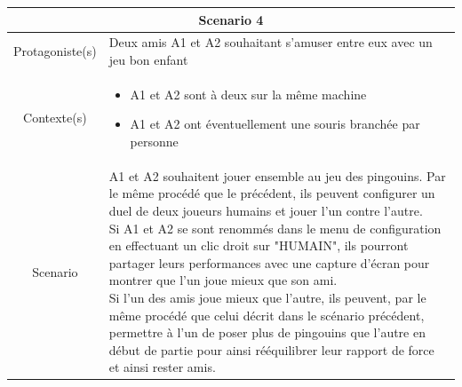 \documentclass{report}
\begin{document}
\begin{tabular}{|c|l|}
\hline
 \multicolumn{2}{|c|}{Scenario 4}\\
 \hline
 Protagoniste(s) & Deux amis A1 et A2 souhaitant s'amuser entre eux avec un jeu bon enfant \\
 \hline
 Contexte(s) & \parbox{13cm} {\begin{itemize}
 	\item A1 et A2 sont à deux sur la même machine
 	\item A1 et A2 ont éventuellement une souris branchée par personne
\end{itemize} }\\
 \hline
 Scenario & \parbox{13cm}{  A1 et A2 souhaitent jouer ensemble au jeu des pingouins. Par le même procédé que le précédent, ils peuvent configurer un duel de deux joueurs humains et jouer l'un contre l'autre. \\
 Si A1 et A2 se sont renommés dans le menu de configuration en effectuant un clic droit sur "HUMAIN", ils pourront partager leurs performances avec une capture d'écran pour montrer que l'un joue mieux que son ami. \\
 Si l'un des amis joue mieux que l'autre, ils peuvent, par le même procédé que celui décrit dans le scénario précédent, permettre à l'un de poser plus de pingouins que l'autre en début de partie pour ainsi rééquilibrer leur rapport de force et ainsi rester amis.} \\
 \hline
 \end{tabular}
\end{document}

